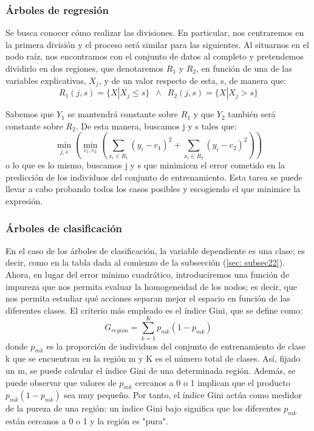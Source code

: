 \documentclass[12pt,twoside]{article}
\begin{document}
\subsubsection{Árboles de regresión}
Se busca conocer cómo realizar las divisiones. En particular, nos centraremos en la primera división y el proceso será similar para las siguientes. Al situarnos en el nodo raíz, nos encontramos con el conjunto de datos al completo y pretendemos dividirlo en dos regiones, que denotaremos $R_1$ y $R_2$, en función de una de las variables explicativas, $X_j$, y de un valor respecto de esta, s, de manera que:
\begin{equation*}
R_1 (j,s) = \{ X | X_j \leq s \} \, \, \, \wedge \, \, \,  R_2 (j,s) = \{ X | X_j > s\}
\end{equation*}

Sabemos que $Y_1$ se mantendrá constante sobre $R_1$ y que $Y_2$ también será constante sobre $R_2$. De esta manera, buscamos j y s tales que:
\begin{equation*}
\min_{j,s}(\min_{c_1, c_2}(\sum_{x_i \in R_1}(y_i - c_1)^2 + \sum_{x_i \in R_2}(y_i - c_2)^2))
\end{equation*}
o lo que es lo mismo, buscamos j y s que minimicen el error cometido en la predicción de los individuos del conjunto de entrenamiento. Esta tarea se puede llevar a cabo probando todos los casos posibles y escogiendo el que minimice la expresión.


\subsubsection{Árboles de clasificación}
En el caso de los árboles de clasificación, la variable dependiente es una clase; es decir, como en la tabla dada al comienzo de la subsección (\ref{sec: subsec22}). Ahora, en lugar del error mínimo cuadrático, introduciremos una función de impureza que nos permita evaluar la homogeneidad de los nodos; es decir, que nos permita estudiar qué acciones separan mejor el espacio en función de las diferentes clases. El criterio más empleado es el índice Gini, que se define como:
\begin{equation*}
G_{region} = \sum_{k=1}^K p_{mk}(1 - p_{mk})
\end{equation*}
donde $p_{mk}$ es la proporción de individuos del conjunto de entrenamiento de clase k que se encuentran en la región m y K es el número total de clases. Así, fijado un m, se puede calcular el índice Gini de una determinada región. Además, se puede observar que valores de $p_{mk}$ cercanos a 0 o 1 implican que el producto $p_{mk}(1- p_{mk})$ sea muy pequeño. Por tanto, el índice Gini actúa como medidor de la pureza de una región: un índice Gini bajo significa que los diferentes $p_{mk}$ están cercanos a 0 o 1 y la región es "pura".
\end{document}
